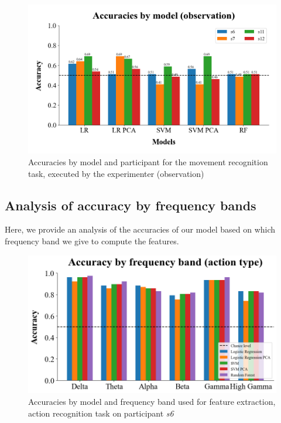 \documentclass[10pt,conference,compsocconf]{IEEEtran}
\begin{document}
\begin{figure}[h!]
    \center
    \includegraphics[width=\linewidth]{../Code/figures/accuracies_across_part_obs.png}
    \caption{Accuracies by model and participant for the movement recognition task, executed by the experimenter (observation)}
    \label{appfig:accuracies_across_part_obs}
\end{figure}
\FloatBarrier

\subsection{Analysis of accuracy by frequency bands}
Here, we provide an analysis of the accuracies of our model based on which frequency band we give to compute the features.

\begin{figure}[h!]
    \center
    \includegraphics[width=\linewidth]{../Code/figures/s6_accuracies_ExObs_freq_bands.png}
    \caption{Accuracies by model and frequency band used for feature extraction, action recognition task on participant \textit{s6}}
    \label{appfig:accuracies_ExObs_freq_bands}
\end{figure}
\FloatBarrier
\end{document}
